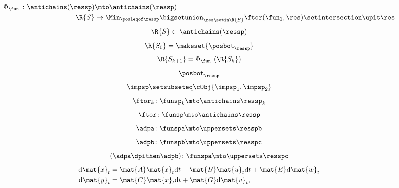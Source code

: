 {\begin{forslides}
    \begin{equation}
        \label{eq:genfun_10}
        \begin{aligned}
            \Phi_{\fun_1}\colon \antichains(\ressp) & \mto \antichains(\ressp) \\
            \R{S}                                   & \mapsto \Min_{\posleqof\ressp} \bigsetunion_{\res \setin \R{S}}\ftor(\fun_1,\res)\setintersection \upit \res
        \end{aligned}
    \end{equation}
    \begin{equation}
        \label{eq:genfun_11}
        \R{S}\subset \antichains(\ressp)
    \end{equation}
    \begin{equation}
        \label{eq:genfun_12}
        \R{S_0}=\makeset{ \posbot_\ressp}
    \end{equation}
    \begin{equation}
        \label{eq:genfun_13}
        \R{S_{k+1}}=\Phi_{\fun_1}(\R{S_k})
    \end{equation}
    \begin{equation}
        \label{eq:genfun_14}
        \posbot_{\ressp}
    \end{equation}
    \begin{equation}
        \label{eq:imp_comp}
        \impsp \setsubseteq \cObj{ \impsp_{1}, \impsp_{2}}
    \end{equation}
    \begin{equation}
        \label{eq:dp_mob_4}
        \ftor_k\colon \funsp_k \mto \antichains \ressp_k
    \end{equation}
    \begin{equation}
        \label{eq:dp_mob_5}
        \ftor\colon \funsp \mto \antichains \ressp
    \end{equation}
    \begin{equation}
        \label{eq:dp_mob_6}
        \adpa\colon \funspa \mto \uppersets \resspb
    \end{equation}
    \begin{equation}
        \label{eq:dp_mob_7}
        \adpb\colon \funspb \mto \uppersets \resspc
    \end{equation}
    \begin{equation}
        \label{eq:dp_mob_8}
        (\adpa\dpithen \adpb) \colon \funspa \mto \uppersets \resspc
    \end{equation}
    \begin{equation}
        \label{eq:cont_dyn}
        \begin{aligned}
            \text{d} \mat{x}_t & =\mat{A}\mat{x}_t\text{d} t+\mat{B}\mat{u}_t \text{d} t+\mat{E} \text{d} \mat{w}_t \\
            \text{d} \mat{y}_t & = \mat{C}\mat{x}_t \text{d} t+\mat{G}\text{d} \mat{v}_t,
        \end{aligned}
    \end{equation}


\end{forslides}}
